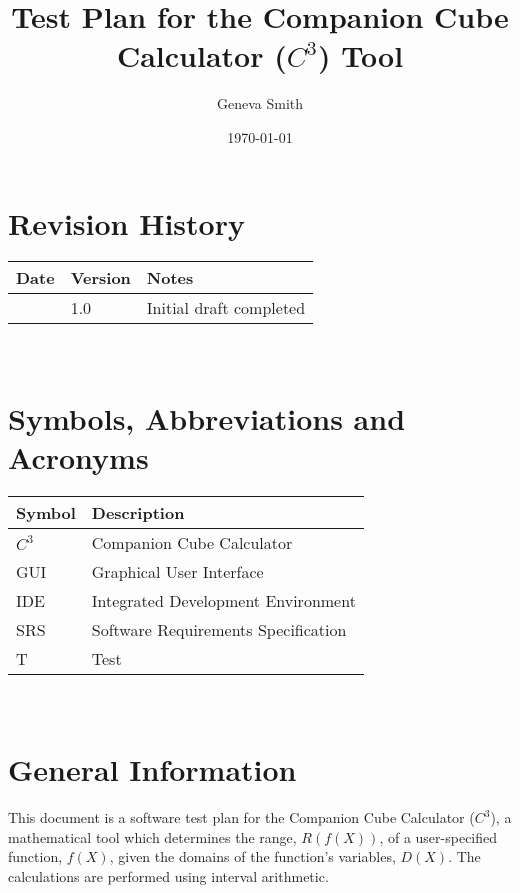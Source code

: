 \documentclass[12pt, titlepage]{article}
\newcommand{\progname}{Companion Cube Calculator} %
\newcommand{\prognameAbbrv}{$C^{3}$}
\begin{document}
\title{Test Plan for the \progname{} (\prognameAbbrv{}) Tool} 
\author{Geneva Smith}
\date{\today}
	
\maketitle


\section{Revision History}

\begin{tabularx}{\textwidth}{p{3cm}p{2cm}X}
\toprule {\bf Date} & {\bf Version} & {\bf Notes}\\
\midrule
 & 1.0 & Initial draft completed\\
\bottomrule
\end{tabularx}

~\newpage

\section{Symbols, Abbreviations and Acronyms}

\renewcommand{\arraystretch}{1.2}
\begin{tabular}{l l} 
  \toprule		
  \textbf{Symbol} & \textbf{Description}\\
  \midrule 
  \prognameAbbrv{} & \progname{}\\
  GUI & Graphical User Interface\\
  IDE & Integrated Development Environment\\
  SRS & Software Requirements Specification\\
  T & Test\\
  \bottomrule
\end{tabular}\\


\newpage

\tableofcontents

\listoftables

\listoffigures

\newpage


\section{General Information}
This document is a software test plan for the \progname{} (\prognameAbbrv{}), a 
mathematical tool which determines the range, $R(f(X))$, of a user-specified 
function, $f(X)$, given the domains of the function's variables, $D(X)$. The 
calculations are performed using interval arithmetic.
\end{document}
